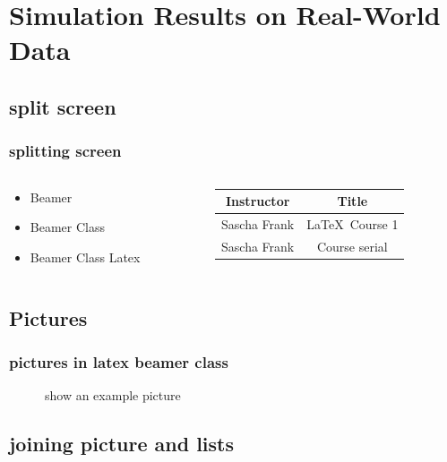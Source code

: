 \documentclass{beamer}
\begin{document}
\begin{frame}

\end{frame}

\section{Simulation Results on Real-World Data}
\subsection{split screen}

\begin{frame}\frametitle{splitting screen}
\begin{columns}
\begin{column}{5cm}
\begin{itemize}
\item Beamer
\item Beamer Class
\item Beamer Class Latex
\end{itemize}
\end{column}
\begin{column}{5cm}
\begin{tabular}{|c|c|}
\hline
\textbf{Instructor} & \textbf{Title} \\
\hline
Sascha Frank &  \LaTeX \ Course 1 \\
\hline
Sascha Frank &  Course serial  \\
\hline
\end{tabular}
\end{column}
\end{columns}
\end{frame}

\subsection{Pictures}
\begin{frame}\frametitle{pictures in latex beamer class}
\begin{figure}
\caption{show an example picture}
\end{figure}
\end{frame}

\subsection{joining picture and lists}
\end{document}
